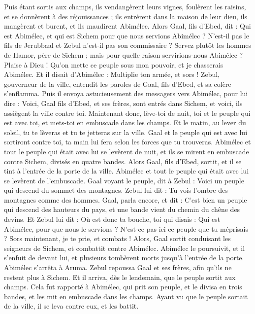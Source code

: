 \begin{multicols}{2}
Puis étant sortis aux champs, ils vendangèrent leurs vignes, foulèrent les raisins, et se donnèrent à des réjouissances ; ils entrèrent dans la maison de leur dieu, ils mangèrent et burent, et ils maudirent Abimélec.
Alors Gaal, fils d'Ebed, dit : Qui est Abimélec, et qui est Sichem pour que nous servions Abimélec ? N'est-il pas le fils de Jerubbaal et Zebul n'est-il pas son commissaire ? Servez plutôt les hommes de Hamor, père de Sichem ; mais pour quelle raison servirions-nous Abimélec ?
Plaise à Dieu ! Qu'on mette ce peuple sous mon pouvoir, et je chasserais Abimélec. Et il disait d'Abimélec : Multiplie ton armée, et sors !
Zebul, gouverneur de la ville, entendit les paroles de Gaal, fils d'Ebed, et sa colère s'enflamma.
Puis il envoya astucieusement des messagers vers Abimélec, pour lui dire : Voici, Gaal fils d'Ebed, et ses frères, sont entrés dans Sichem, et voici, ils assiègent la ville contre toi.
Maintenant donc, lève-toi de nuit, toi et le peuple qui est avec toi, et mets-toi en embuscade dans les champs.
Et le matin, au lever du soleil, tu te lèveras et tu te jetteras sur la ville. Gaal et le peuple qui est avec lui sortiront contre toi, ta main lui fera selon les forces que tu trouveras.
Abimélec et tout le peuple qui était avec lui se levèrent de nuit, et ils se mirent en embuscade contre Sichem, divisés en quatre bandes.
Alors Gaal, fils d'Ebed, sortit, et il se tint à l'entrée de la porte de la ville. Abimélec et tout le peuple qui était avec lui se levèrent de l'embuscade.
Gaal voyant le peuple, dit à Zebul : Voici un peuple qui descend du sommet des montagnes. Zebul lui dit : Tu vois l'ombre des montagnes comme des hommes.
Gaal, parla encore, et dit : C'est bien un peuple qui descend des hauteurs du pays, et une bande vient du chemin du chêne des devins.
Et Zebul lui dit : Où est donc ta bouche, toi qui disais : Qui est Abimélec, pour que nous le servions ? N'est-ce pas ici ce peuple que tu méprisais ? Sors maintenant, je te prie, et combats !
Alors, Gaal sortit conduisant les seigneurs de Sichem, et combattit contre Abimélec.
Abimélec le poursuivit, et il s'enfuit de devant lui, et plusieurs tombèrent morts jusqu'à l'entrée de la porte.
Abimélec s'arrêta à Aruma. Zebul repoussa Gaal et ses frères, afin qu'ils ne restent plus à Sichem.
Et il arriva, dès le lendemain, que le peuple sortit aux champs. Cela fut rapporté à Abimélec,
qui prit son peuple, et le divisa en trois bandes, et les mit en embuscade dans les champs. Ayant vu que le peuple sortait de la ville, il se leva contre eux, et les battit.

\end{multicols}
